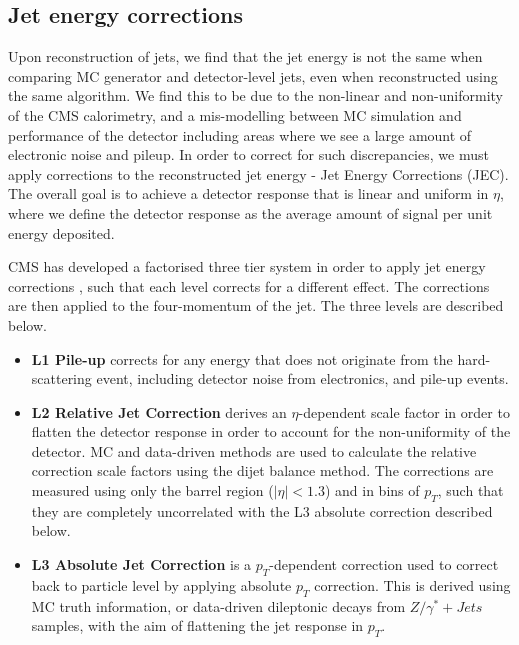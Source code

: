 
\subsection{Jet energy corrections} \label{subsec-JEC}

Upon reconstruction of jets, we find that the jet energy is not the same when comparing MC generator and detector-level jets, even when reconstructed using the same algorithm. We find this to be due to the non-linear and non-uniformity of the CMS calorimetry, and a mis-modelling between MC simulation and performance of the detector including areas where we see a large amount of electronic noise and pileup. In order to correct for such discrepancies, we must apply corrections to the reconstructed jet energy - Jet Energy Corrections (JEC). The overall goal is to achieve a detector response that is linear and uniform in $\eta$, where we define the detector response as the average amount of signal per unit energy deposited.

CMS has developed a factorised three tier system in order to apply jet energy corrections \cite{1742-6596-404-1-012014}, such that each level corrects for a different effect. The corrections are then applied to the four-momentum of the jet. The three levels are described below.

\begin{itemize}
	\item \textbf{L1 Pile-up} corrects for any energy that does not originate from the hard-scattering event, including detector noise from electronics, and pile-up events.
	\item \textbf{L2 Relative Jet Correction} derives an $\eta$-dependent scale factor in order to flatten the detector response in order to account for the non-uniformity of the detector. MC and data-driven methods are used to calculate the relative correction scale factors using the dijet balance method. The corrections are measured using only the barrel region ($|\eta| < 1.3$) and in bins of $p_T$, such that they are completely uncorrelated with the L3 absolute correction described below. 
	\item \textbf{L3 Absolute Jet Correction} is a $p_T$-dependent correction used to correct back to particle level by applying absolute $p_T$ correction. This is derived using MC truth information, or data-driven dileptonic decays from $Z/\gamma^*+Jets$ samples, with the aim of flattening the jet response in $p_T$. 
\end{itemize} 

